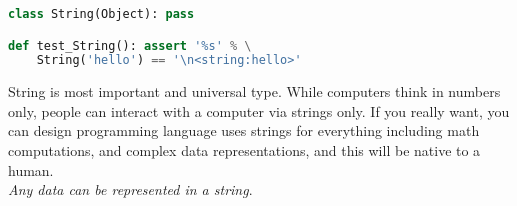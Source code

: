 \clearpage{}

\begin{lstlisting}[language=Python]
class String(Object): pass

def test_String(): assert '%s' % \
	String('hello') == '\n<string:hello>'
\end{lstlisting}

\noindent
String is most important and universal type. While computers think in numbers
only, people can interact with a computer via strings only. If you really want,
you can design programming language uses strings for everything including math
computations, and complex data representations, and this will be native to a
human.\\\emph{Any data can be represented in a string}.
